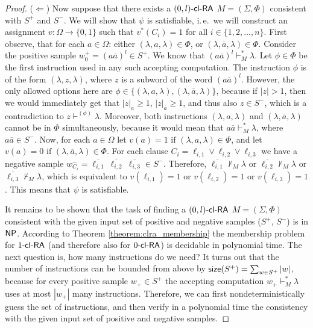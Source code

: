 \begin{proof}
($\Leftarrow$)
Now suppose that there exists a $\zlclRA$ $M = (\Sigma, \Phi)$ consistent with $S^+$ and $S^-$. We will show that $\psi$ is satisfiable, i.\,e.\ we will construct an assignment $v: \Omega \to \{0, 1\}$ such that $v^*(C_i) = 1$ for all $i \in \{1, 2, \ldots, n\}$. First observe, that for each $a \in \Omega$: either $(\lambda, a, \lambda) \in \Phi$, or $(\lambda, \overline{a}, \lambda) \in \Phi$. Consider the positive sample $w_0^+ = (a \overline{a})^l \in S^+$. We know that $(a \overline{a})^l \vdash_M^* \lambda$. Let $\phi \in \Phi$ be the first instruction used in any such accepting computation. The instruction $\phi$ is of the form $(\lambda, z, \lambda)$, where $z$ is a subword of the word $(a \overline{a})^l$. However, the only allowed options here are $\phi \in \{ (\lambda, a, \lambda), (\lambda, \overline{a}, \lambda) \}$, because if $|z| > 1$, then we would immediately get that $|z|_a \ge 1$, $|z|_{\overline{a}} \ge 1$, and thus also $z \in S^-$, which is a contradiction to $z \vdash^{(\phi)} \lambda$. Moreover, both instructions $(\lambda, a, \lambda)$ and $(\lambda, \overline{a}, \lambda)$ cannot be in $\Phi$ simultaneously, because it would mean that $a \overline{a} \vdash_M^* \lambda$, where $a \overline{a} \in S^-$. Now, for each $a \in \Omega$ let $v(a) = 1 \text{ if } (\lambda, a, \lambda) \in \Phi$, and let $v(a) = 0 \text{ if } (\lambda, \overline{a}, \lambda) \in \Phi$. For each clause $C_i = \ell_{i,1} \vee \ell_{i,2} \vee \ell_{i,3}$ we have a negative sample $w_{C_i}^- = \overline{\ell_{i,1}}\ \overline{\ell_{i,2}}\ \overline{\ell_{i,3}} \in S^-$. Therefore, $\overline{\ell_{i,1}} \not\vdash_M \lambda$ or $\overline{\ell_{i,2}} \not\vdash_M \lambda$ or $\overline{\ell_{i,3}} \not\vdash_M \lambda$, which is equivalent to $v(\ell_{i,1}) = 1$ or $v(\ell_{i,2}) = 1$ or $v(\ell_{i,3}) = 1$. This means that $\psi$ is satisfiable.

It remains to be shown that the task of finding a $\zlclRA$ $M = (\Sigma, \Phi)$ consistent with the given input set of positive and negative samples ($S^+$, $S^-$) is in $\classNP$. According to Theorem \ref{theorem:clra_membership} the membership problem for $\kclRA[1]$ (and therefore also for $\kclRA[0]$) is decidable in polynomial time. The next question is, how many instructions do we need? It turns out that the number of instructions can be bounded from above by $\size(S^+) = \sum_{w \in S^+} |w|$, because for every positive sample $w_+ \in S^+$ the accepting computation $w_+ \vdash_M^* \lambda$ uses at most $|w_+|$ many instructions. Therefore, we can first nondeterministically guess the set of instructions, and then verify in a polynomial time the consistency with the given input set of positive and negative samples.
\end{proof}

